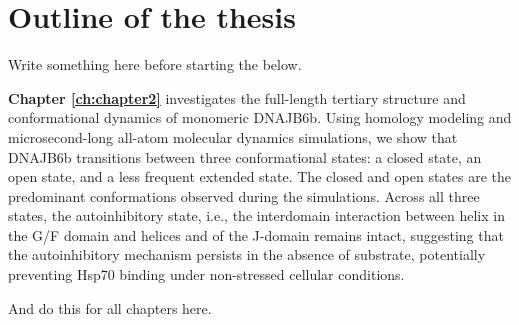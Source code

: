 \clearpage

\section{Outline of the thesis}
Write something here before starting the below.

\textbf{Chapter \ref{ch:chapter2}}  investigates the full-length tertiary structure and conformational dynamics of monomeric DNAJB6b.
Using homology modeling and microsecond-long all-atom molecular dynamics simulations, we show that DNAJB6b transitions between three conformational states: a closed state, an open state, and a less frequent extended state.
The closed and open states are the predominant conformations observed during the simulations.
Across all three states, the autoinhibitory state, i.e., the interdomain interaction between helix  in the G/F domain and helices  and  of the J-domain remains intact, suggesting that the autoinhibitory mechanism persists in the absence of substrate, potentially preventing Hsp70 binding under non-stressed cellular conditions.

And do this for all chapters here.
